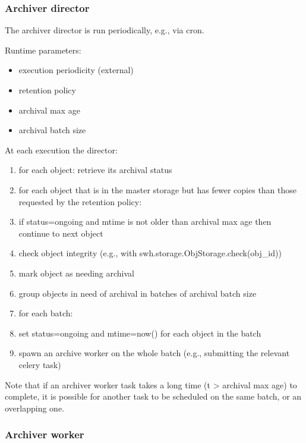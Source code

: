 \subsubsection{Archiver director}\label{archiver-director}

The archiver director is run periodically, e.g., via cron.

Runtime parameters:

\begin{itemize}
\itemsep1pt\parskip0pt
\item
  execution periodicity (external)
\item
  retention policy
\item
  archival max age
\item
  archival batch size
\end{itemize}

At each execution the director:

\begin{enumerate}
\def\labelenumi{\arabic{enumi}.}
\itemsep1pt\parskip0pt
\item
  for each object: retrieve its archival status
\item
  for each object that is in the master storage but has fewer copies
  than those requested by the retention policy:
\item
  if status=ongoing and mtime is not older than archival max age then
  continue to next object
\item
  check object integrity (e.g., with
  swh.storage.ObjStorage.check(obj\_id))
\item
  mark object as needing archival
\item
  group objects in need of archival in batches of archival batch size
\item
  for each batch:
\item
  set status=ongoing and mtime=now() for each object in the batch
\item
  spawn an archive worker on the whole batch (e.g., submitting the
  relevant celery task)
\end{enumerate}

Note that if an archiver worker task takes a long time (t \textgreater{}
archival max age) to complete, it is possible for another task to be
scheduled on the same batch, or an overlapping one.

\subsubsection{Archiver worker}\label{archiver-worker}

